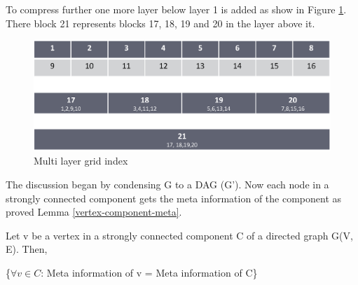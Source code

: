 
To compress further one more layer below layer 1 is added as show in Figure \ref{fig:multi-grid2}. There block 21 represents blocks 17, 18, 19 and 20 in the layer above it. 

\begin{figure}[t]
    \centering
    \includegraphics[width=0.88\linewidth]{images/multi_layer_grid_index.eps}
    \caption{Multi layer grid index}
    \label{fig:multi-grid2}
\end{figure}

The discussion began by condensing G to a DAG (G'). Now each node in a strongly connected component gets the meta information of the component as proved Lemma \ref{vertex-component-meta}.

\begin{lemma}
\label{vertex-component-meta}
Let v be a vertex in a strongly connected component C of a directed graph G(V, E). Then,

{\{$\forall v \in C$: Meta information of v = Meta information of C\}}\\
\end{lemma}


